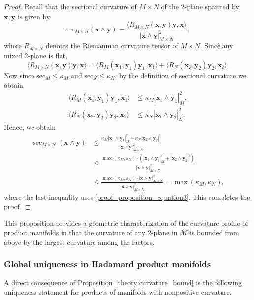 \documentclass[10pt]{article}
\newcommand{\bfx}{\boldsymbol{x}}
\newcommand{\bfy}{\boldsymbol{y}}
\newcommand{\calM}{\mathcal{M}}
\begin{document}
\begin{proof}
Recall that the sectional curvature of $M\times N$ of the 2-plane spanned by $\bfx, \bfy$ is given by 
\begin{equation*}
	\text{sec}_{M\times N}(\bfx\wedge \bfy) = \frac{\langle R_{M\times N}(\bfx,\bfy) \bfy, \bfx \rangle}{|\bfx\wedge \bfy|^2_{M\times N}},
\end{equation*}
where $R_{M\times N}$ denotes the Riemannian curvature tensor of $M\times N$. Since any mixed 2-plane is flat,
\begin{equation*}
	\langle R_{M\times N}(\bfx,\bfy) \bfy, \bfx \rangle = \langle R_{M}(\bfx_1,\bfy_1) \bfy_1, \bfx_1 \rangle + 
	\langle R_{N}(\bfx_2,\bfy_2) \bfy_2, \bfx_2 \rangle.
\end{equation*}
Now since $\text{sec}_M \leq \kappa_M$ and $\text{sec}_N \leq \kappa_N$, by the definition of sectional curvature we obtain
\begin{align*}
	\langle R_{M}(\bfx_1,\bfy_1) \bfy_1, \bfx_1 \rangle &\leq \kappa_M |\bfx_1\wedge \bfy_1|^2_M,\\
	\langle R_{N}(\bfx_2,\bfy_2) \bfy_2, \bfx_2 \rangle &\leq \kappa_N |\bfx_2\wedge \bfy_2|^2_N.
\end{align*}
Hence, we obtain
\begin{align*}
	\sec_{M\times N}(\bfx\wedge \bfy) &\leq \frac{\kappa_M |\bfx_1\wedge \bfy_1|_M^2 + \kappa_N |\bfx_2 \wedge \bfy_2|^2}{|\bfx\wedge \bfy|_{M\times N}^2} \\ 
	&\leq \frac{\max(\kappa_M, \kappa_N)\cdot  ( |\bfx_1\wedge \bfy_1|_M^2 +  |\bfx_2 \wedge \bfy_2|^2)}{|\bfx\wedge \bfy|_{M\times N}^2} \\
	&\leq \frac{\max(\kappa_M, \kappa_N)\cdot |\bfx\wedge \bfy|_{M\times N}^2}{|\bfx\wedge \bfy|_{M\times N}^2} = \max(\kappa_M, \kappa_N),
\end{align*}
where the last inequality uses  \eqref{proof_proposition_equation3}. This completes the proof.
\end{proof}

This proposition provides a geometric characterization of the curvature profile of product manifolds in that the curvature of any 2-plane in $\calM$ is bounded from above by the largest curvature among the factors. 


\subsubsection{Global uniqueness in Hadamard product manifolds}


A direct consequence of Proposition~\ref{theory:curvature_bound} is the following uniqueness statement for products of manifolds with nonpositive curvature. 
\end{document}
